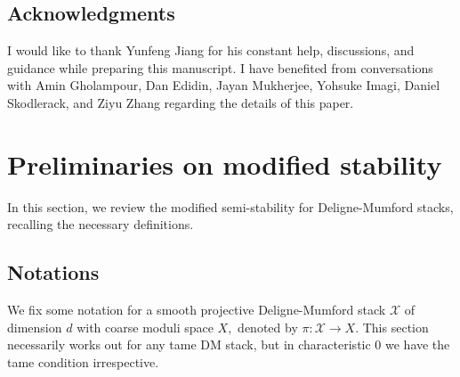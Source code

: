 \documentclass[10pt]{amsart}
\newcommand{\Gm}{{{\mathbb G}_{\mbox{\tiny\rm m}}}}
\newcommand{\sX}{{\mathcal X}}
\numberwithin{equation}{subsection}
\begin{document}



\subsection*{Acknowledgments}

I would like to thank Yunfeng Jiang for his constant help, discussions, and guidance while preparing this manuscript. I have benefited from conversations with Amin Gholampour, Dan Edidin, Jayan Mukherjee, Yohsuke Imagi, Daniel Skodlerack, and Ziyu Zhang regarding the details of this paper.




\section{Preliminaries on modified stability}\label{sec_preliminaries}

In this section, we review the modified semi-stability for Deligne-Mumford stacks, recalling the necessary definitions.

\subsection{Notations}%

We fix some notation for a smooth projective  Deligne-Mumford stack $\sX$ of dimension $d$ with coarse moduli space $X,$ denoted by $\pi:\sX \to X$. This section necessarily works out for any tame DM stack, but in characteristic 0 we have the tame condition irrespective.
\end{document}
